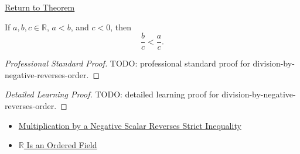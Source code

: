 \newpage
{}
\label{prf:division-by-negative-reverses-order}

\begin{remark*}[Return]
\hyperref[lem:division-by-negative-reverses-order]{Return to Theorem}
\end{remark*}

\begin{lemma*}
If $a,b,c\in\mathbb{R}$, $a<b$, and $c<0$, then
\[
\frac bc<\frac ac.
\]
\end{lemma*}

\begin{proof}[Professional Standard Proof]
\LRAProofBodyStart
TODO: professional standard proof for division-by-negative-reverses-order.
\end{proof}

\begin{proof}[Detailed Learning Proof]
\LRAProofBodyStart
TODO: detailed learning proof for division-by-negative-reverses-order.
\end{proof}

\begin{remark*}
\end{remark*}

\begin{dependencies}
\begin{itemize}
  \item \hyperref[thm:ineq-multiply-negative]{Multiplication by a Negative Scalar Reverses Strict Inequality}
  \item \hyperref[thm:r-is-an-ordered-field]{$\mathbb{R}$ Is an Ordered Field}
\end{itemize}
\end{dependencies}

\clearpage

